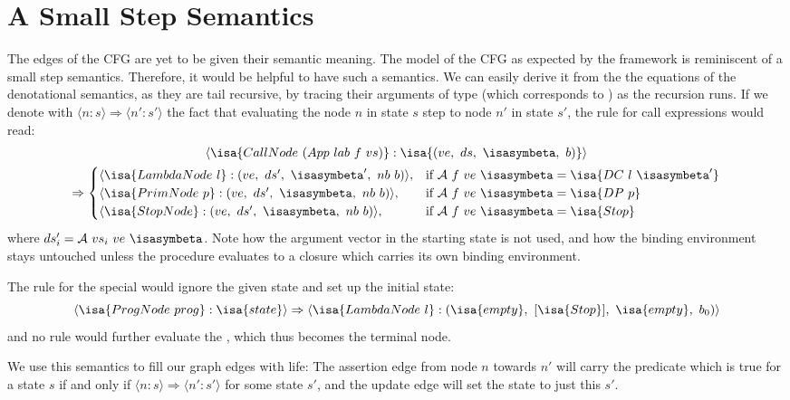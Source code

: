 \documentclass[a4paper,parskip=half,BCOR=8mm,DIV=calc,12pt]{scrbook}
\newcommand{\A}{\mathcal A}
\begin{document}
\section{A Small Step Semantics}

The edges of the CFG are yet to be given their semantic meaning. The model of the CFG as expected by the framework is reminiscent of a small step semantics. Therefore, it would be helpful to have such a semantics. We can easily derive it from the the equations of the denotational semantics, as they are tail recursive, by tracing their arguments of type  (which corresponds to ) as the recursion runs. If we denote with $\langle n:s\rangle \Rightarrow \langle n':s'\rangle$ the fact that evaluating the node $n$ in state $s$ step to node $n'$ in state $s'$, the rule for call expressions would read:
\begin{multline*}
\langle \isa{CallNode\ (App\ lab\ f\ vs)} : \isa{(ve,\ ds,\ \isasymbeta,\ b)}\rangle \\ \Rightarrow 
\begin{cases}
\langle \isa{LambdaNode\ l} : (ve,\ ds',\ \isasymbeta',\ nb\ b) \rangle, & \text{if } \A\ f\ ve\ \isasymbeta = \isa{DC\ l\ \isasymbeta'} \\
\langle \isa{PrimNode\ p} : (ve,\ ds',\ \isasymbeta,\ nb\ b) \rangle, & \text{if } \A\ f\ ve\ \isasymbeta = \isa{DP\ p} \\
\langle \isa{StopNode} : (ve,\ ds',\ \isasymbeta,\ nb\ b) \rangle, & \text{if } \A\ f\ ve\ \isasymbeta = \isa{Stop} 
\end{cases}
\end{multline*}
where $ds'_i = \A\ vs_i\ ve\ \isasymbeta$. Note how the argument vector  in the starting state is not used, and how the binding environment stays untouched unless the procedure  evaluates to a closure which carries its own binding environment.

The rule for the special  would ignore the given state and set up the initial state: 
\[
\langle \isa{ProgNode\ prog} : \isa{state}\rangle \Rightarrow 
\langle \isa{LambdaNode\ l} : (\isa{empty},\ [\isa{Stop}],\ \isa{empty},\ b_0)\rangle
\]
and no rule would further evaluate the , which thus becomes the terminal node.

We use this semantics to fill our graph edges with life: The assertion edge from node $n$ towards $n'$ will carry the predicate which is true for a state $s$ if and only if $\langle n:s\rangle \Rightarrow \langle n':s'\rangle$ for some state $s'$, and the update edge will set the state to just this $s'$.
\end{document}
